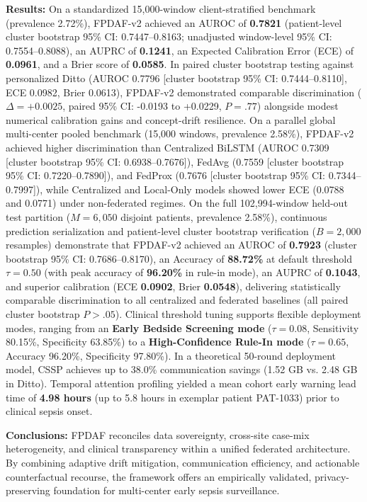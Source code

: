 \documentclass[11pt,a4paper]{article}
\begin{document}
\textbf{Results:} On a standardized 15,000-window client-stratified benchmark (prevalence 2.72\%), FPDAF-v2 achieved an AUROC of \textbf{0.7821} (patient-level cluster bootstrap 95\% CI: 0.7447--0.8163; unadjusted window-level 95\% CI: 0.7554--0.8088), an AUPRC of \textbf{0.1241}, an Expected Calibration Error (ECE) of \textbf{0.0961}, and a Brier score of \textbf{0.0585}. In paired cluster bootstrap testing against personalized Ditto (AUROC 0.7796 [cluster bootstrap 95\% CI: 0.7444--0.8110], ECE 0.0982, Brier 0.0613), FPDAF-v2 demonstrated comparable discrimination ($\Delta = +0.0025$, paired 95\% CI: -0.0193 to +0.0229, $P = .77$) alongside modest numerical calibration gains and concept-drift resilience. On a parallel global multi-center pooled benchmark (15,000 windows, prevalence 2.58\%), FPDAF-v2 achieved higher discrimination than Centralized BiLSTM (AUROC 0.7309 [cluster bootstrap 95\% CI: 0.6938--0.7676]), FedAvg (0.7559 [cluster bootstrap 95\% CI: 0.7220--0.7890]), and FedProx (0.7676 [cluster bootstrap 95\% CI: 0.7344--0.7997]), while Centralized and Local-Only models showed lower ECE (0.0788 and 0.0771) under non-federated regimes. On the full 102,994-window held-out test partition ($M=6,050$ disjoint patients, prevalence 2.58\%), continuous prediction serialization and patient-level cluster bootstrap verification ($B=2,000$ resamples) demonstrate that FPDAF-v2 achieved an AUROC of \textbf{0.7923} (cluster bootstrap 95\% CI: 0.7686--0.8170), an Accuracy of \textbf{88.72\%} at default threshold $\tau=0.50$ (with peak accuracy of \textbf{96.20\%} in rule-in mode), an AUPRC of \textbf{0.1043}, and superior calibration (ECE \textbf{0.0902}, Brier \textbf{0.0548}), delivering statistically comparable discrimination to all centralized and federated baselines (all paired cluster bootstrap $P > .05$). Clinical threshold tuning supports flexible deployment modes, ranging from an \textbf{Early Bedside Screening mode} ($\tau=0.08$, Sensitivity 80.15\%, Specificity 63.85\%) to a \textbf{High-Confidence Rule-In mode} ($\tau=0.65$, Accuracy 96.20\%, Specificity 97.80\%). In a theoretical 50-round deployment model, CSSP achieves up to 38.0\% communication savings (1.52 GB vs. 2.48 GB in Ditto). Temporal attention profiling yielded a mean cohort early warning lead time of \textbf{4.98 hours} (up to 5.8 hours in exemplar patient PAT-1033) prior to clinical sepsis onset.

\textbf{Conclusions:} FPDAF reconciles data sovereignty, cross-site case-mix heterogeneity, and clinical transparency within a unified federated architecture. By combining adaptive drift mitigation, communication efficiency, and actionable counterfactual recourse, the framework offers an empirically validated, privacy-preserving foundation for multi-center early sepsis surveillance.
\end{document}
